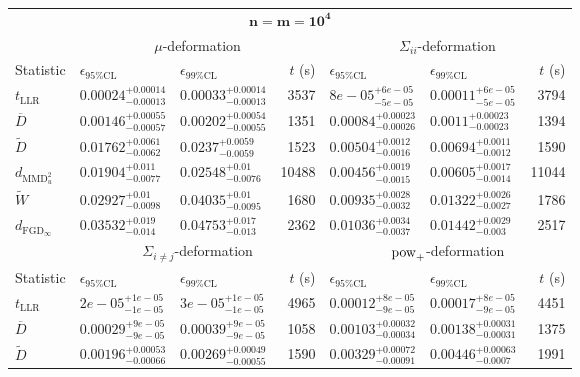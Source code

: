 \begin{tabular}{l|llr|llr}
	\toprule
	\multicolumn{7}{c}{$\mathbf{n=m=10^{4}}$} \\
	\multicolumn{1}{c}{} & \multicolumn{3}{c}{$\mu$-deformation} & \multicolumn{3}{c}{$\Sigma_{ii}$-deformation} \\
	Statistic & $\epsilon_{95\%\mathrm{CL}}$ & $\epsilon_{99\%\mathrm{CL}}$ & $t$ (s) & $\epsilon_{95\%\mathrm{CL}}$ & $\epsilon_{99\%\mathrm{CL}}$ & $t$ (s) \\
	\midrule
	$t_{\mathrm{LLR}}$ & $0.00024_{-0.00013}^{+0.00014}$ & $0.00033_{-0.00013}^{+0.00014}$ & 3537 & $8e-05_{-5e-05}^{+6e-05}$ & $0.00011_{-5e-05}^{+6e-05}$ & 3794 \\
	$\overline{D}$ & $0.00146_{-0.00057}^{+0.00055}$ & $0.00202_{-0.00055}^{+0.00054}$ & 1351 & $0.00084_{-0.00026}^{+0.00023}$ & $0.0011_{-0.00023}^{+0.00023}$ & 1394 \\
	$\widetilde{D}$ & $0.01762_{-0.0062}^{+0.0061}$ & $0.0237_{-0.0059}^{+0.0059}$ & 1523 & $0.00504_{-0.0016}^{+0.0012}$ & $0.00694_{-0.0012}^{+0.0011}$ & 1590 \\
	$d_{\mathrm{MMD}^{2}_{u}}$ & $0.01904_{-0.0077}^{+0.011}$ & $0.02548_{-0.0076}^{+0.01}$ & 10488 & $0.00456_{-0.0015}^{+0.0019}$ & $0.00605_{-0.0014}^{+0.0017}$ & 11044 \\
	$\widetilde{W}$ & $0.02927_{-0.0098}^{+0.01}$ & $0.04035_{-0.0095}^{+0.01}$ & 1680 & $0.00935_{-0.0032}^{+0.0028}$ & $0.01322_{-0.0027}^{+0.0026}$ & 1786 \\
	$d_{\mathrm{FGD}_{\infty}}$ & $0.03532_{-0.014}^{+0.019}$ & $0.04753_{-0.013}^{+0.017}$ & 2362 & $0.01036_{-0.0037}^{+0.0034}$ & $0.01442_{-0.003}^{+0.0029}$ & 2517 \\
	\toprule
	\multicolumn{1}{c}{} & \multicolumn{3}{c}{$\Sigma_{i\neq j}$-deformation} & \multicolumn{3}{c}{$\rm{pow}_{+}$-deformation} \\
	Statistic & $\epsilon_{95\%\mathrm{CL}}$ & $\epsilon_{99\%\mathrm{CL}}$ & $t$ (s) & $\epsilon_{95\%\mathrm{CL}}$ & $\epsilon_{99\%\mathrm{CL}}$ & $t$ (s) \\
	\midrule
	$t_{\mathrm{LLR}}$ & $2e-05_{-1e-05}^{+1e-05}$ & $3e-05_{-1e-05}^{+1e-05}$ & 4965 & $0.00012_{-9e-05}^{+8e-05}$ & $0.00017_{-9e-05}^{+8e-05}$ & 4451 \\
	$\overline{D}$ & $0.00029_{-9e-05}^{+9e-05}$ & $0.00039_{-9e-05}^{+9e-05}$ & 1058 & $0.00103_{-0.00034}^{+0.00032}$ & $0.00138_{-0.00031}^{+0.00031}$ & 1375 \\
	$\widetilde{D}$ & $0.00196_{-0.00066}^{+0.00053}$ & $0.00269_{-0.00055}^{+0.00049}$ & 1590 & $0.00329_{-0.00091}^{+0.00072}$ & $0.00446_{-0.0007}^{+0.00063}$ & 1991 \\

\end{tabular}
